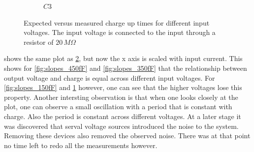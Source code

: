 \begin{figure}[h]
\begin{subfigure}[b]{0.475\textwidth}
                            \caption[]
                                {$C3$}    
                                \label{fig:slopes_50fF}
                        \end{subfigure}
                    \caption{Expected versus measured charge up times for different input voltages. The input voltage is connected to the input through a resistor of $20\,M\Omega$}
                \label{fig:slopes}
        \end{figure}
    
     shows the same plot as \cref{fig:slopes}, but now the x axis is scaled with input current. This shows for \cref{fig:slopes_450fF} and \ref{fig:slopes_350fF} that the relationship between output voltage and charge is equal across different input voltages. For \cref{fig:slopes_150fF} and \ref{fig:slopes_50fF} however, one can see that the higher voltages lose this property. Another intersting observation is that when one looks closely at the plot, one can observe a small oscillation with a period that is constant with charge. Also the period is constant across different voltages. At a later stage it was discovered that serval voltage sources introduced the noise to the system. Removing these devices also removed the observed noise. There was at that point no time left to redo all the measurements however. 


